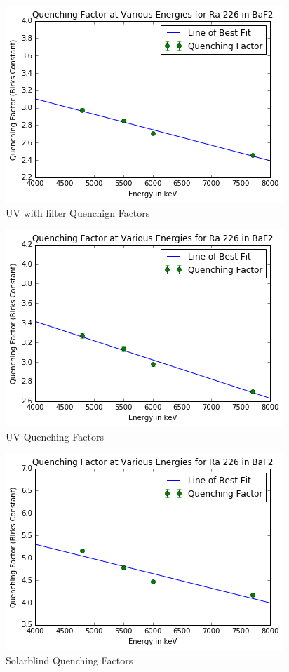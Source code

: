 \documentclass[aip, jmp, amssymb, amsmath, reprint, floatfix]{revtex4-1}
\begin{document}
\begin{figure}
  \centering
    \includegraphics[width=.8\columnwidth]{qff.png}
  \caption{UV with filter Quenchign Factors}
  \label{fig:qff}
\end{figure} 

\begin{figure}
  \centering
    \includegraphics[width=.8\columnwidth]{qfuv.png}
  \caption{UV Quenching Factors}
  \label{fig:qfuv}
\end{figure} 

\begin{figure}
  \centering
    \includegraphics[width=.8\columnwidth]{qfsb.png}
  \caption{Solarblind Quenching Factors}
  \label{fig:qfsb}
\end{figure} 
\end{document}

